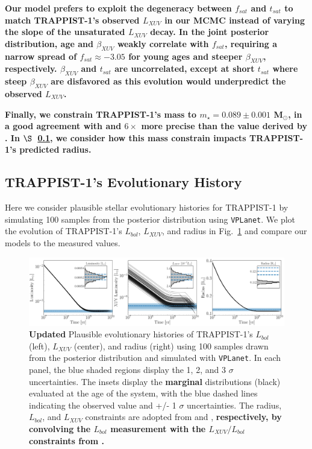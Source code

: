 \documentclass[twocolumn]{aastex62}
\newcommand{\xxx}[1]{{\textbf{#1}}}
\newcommand{\vplanet}[0]{\texttt{VPLanet}\xspace}
\begin{document}
\xxx{Our model prefers to exploit the degeneracy between $f_{sat}$ and $t_{sat}$ to match TRAPPIST-1's observed $L_{XUV}$ in our MCMC instead of varying the slope of the unsaturated $L_{XUV}$ decay. In the joint posterior distribution, age and $\beta_{XUV}$ weakly correlate with $f_{sat}$, requiring a narrow spread of $f_{sat} \approx -3.05$ for young ages and steeper $\beta_{XUV}$, respectively. $\beta_{XUV}$ and $t_{sat}$ are uncorrelated, except at short $t_{sat}$ where steep $\beta_{XUV}$ are disfavored as this evolution would underpredict the observed $L_{XUV}$.}

\xxx{Finally, we constrain TRAPPIST-1's mass to $m_{\star} = 0.089 \pm{0.001}$ M$_{\odot}$, in a good agreement with and $6\times$ more precise than the value derived by \citet{vanGrootel2018}. In $\S$~\ref{sec:evol}, we consider how this mass constrain impacts TRAPPIST-1's predicted radius.}

\subsection{TRAPPIST-1's Evolutionary History} \label{sec:evol}

Here we consider plausible stellar evolutionary histories for TRAPPIST-1 by simulating 100 samples from the posterior distribution using \vplanet. We plot the evolution of TRAPPIST-1's $L_{bol}$, $L_{XUV}$, and radius in Fig.~\ref{fig:evol} and compare our models to the measured values. 

\begin{figure}[t]
	\includegraphics[width=\textwidth]{../Analysis/Evol/trappist1Evol.pdf}
   \caption{\xxx{Updated} Plausible evolutionary histories of TRAPPIST-1's $L_{bol}$ (left), $L_{XUV}$ (center), and radius (right) using 100 samples drawn from the posterior distribution and simulated with \vplanet. In each panel, the blue shaded regions display the 1, 2, and 3 $\sigma$ uncertainties. The insets display the \xxx{marginal} distributions (black) evaluated at the age of the system, with the blue dashed lines indicating the observed value and +/- 1 $\sigma$ uncertainties. The radius, $L_{bol}$, and $L_{XUV}$ constraints are adopted from \citet{vanGrootel2018} and \citet{Wheatley2017}, \xxx{respectively, by convolving the \citet{vanGrootel2018} $L_{bol}$ measurement with the $L_{XUV}/L_{bol}$ constraints from \citet{Wheatley2017}.}}%
    \label{fig:evol}%
\end{figure}
\end{document}
